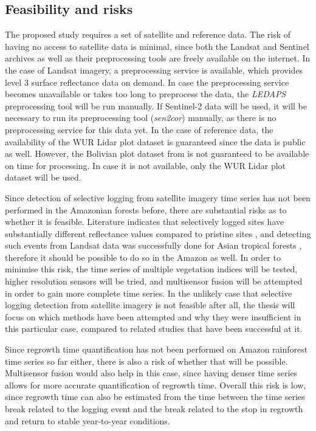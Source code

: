 \documentclass[a4paper,10pt]{article}
\begin{document}
\subsection{Feasibility and risks}

The proposed study requires a set of satellite and reference data. The risk of having no access to satellite data is minimal, since both the Landsat and Sentinel archives as well as their preprocessing tools are freely available on the internet. In the case of Landsat imagery, a preprocessing service is available, which provides level 3 surface reflectance data on demand. In case the preprocessing service becomes unavailable or takes too long to preprocess the data, the \textit{LEDAPS} preprocessing tool will be run manually. If Sentinel-2 data will be used, it will be necessary to run its preprocessing tool (\textit{sen2cor}) manually, as there is no preprocessing service for this data yet. In the case of reference data, the availability of the \ac{WUR} Lidar plot dataset is guaranteed since the data is public as well. However, the Bolivian plot dataset from \citet{broadbent_recovery_2006} is not guaranteed to be available on time for processing. In case it is not available, only the \ac{WUR} Lidar plot dataset will be used.

Since detection of selective logging from satellite imagery time series has not been performed in the Amazonian forests before, there are substantial risks as to whether it is feasible. Literature indicates that selectively logged sites have substantially different reflectance values compared to pristine sites \citep{broadbent_recovery_2006}, and detecting such events from Landsat data was successfully done for Asian tropical forests \citep{shimizu_using_2017}, therefore it should be possible to do so in the Amazon as well. In order to minimise this risk, the time series of multiple vegetation indices will be tested, higher resolution sensors will be tried, and multisensor fusion will be attempted in order to gain more complete time series. In the unlikely case that selective logging detection from satellite imagery is not feasible after all, the thesis will focus on which methods have been attempted and why they were insufficient in this particular case, compared to related studies that have been successful at it.

Since regrowth time quantification has not been performed on Amazon rainforest time series so far either, there is also a risk of whether that will be possible. Multisensor fusion would also help in this case, since having denser time series allows for more accurate quantification of regrowth time. Overall this risk is low, since regrowth time can also be estimated from the time between the time series break related to the logging event and the break related to the stop in regrowth and return to stable year-to-year conditions.
\end{document}
